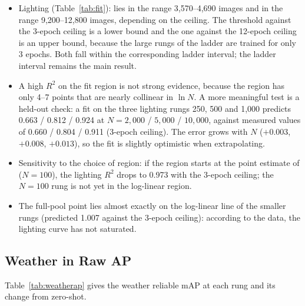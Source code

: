 \begin{itemize}
\item Lighting (Table~\ref{tab:fit}): \Nsf lies in the range 3,570--4,690 images and \Nnf in the range 9,200--12,800 images, depending on the ceiling. The threshold against the 3-epoch ceiling is a lower bound and the one against the 12-epoch ceiling is an upper bound, because the large rungs of the ladder are trained for only 3 epochs. Both fall within the corresponding ladder interval; the ladder interval remains the main result.
\item A high $R^2$ on the fit region is not strong evidence, because the region has only 4--7 points that are nearly collinear in $\ln N$. A more meaningful test is a held-out check: a fit on the three lighting rungs 250, 500 and 1,000 predicts 0.663 / 0.812 / 0.924 at $N = 2{,}000$ / $5{,}000$ / $10{,}000$, against measured values of 0.660 / 0.804 / 0.911 (3-epoch ceiling). The error grows with $N$ ($+0.003$, $+0.008$, $+0.013$), so the fit is slightly optimistic when extrapolating.
\item Sensitivity to the choice of region: if the region starts at the point estimate of \NBE ($N = 100$), the lighting $R^2$ drops to 0.973 with the 3-epoch ceiling; the $N = 100$ rung is not yet in the log-linear region.
\item The full-pool point lies almost exactly on the log-linear line of the smaller rungs (predicted 1.007 against the 3-epoch ceiling): according to the data, the lighting curve has not saturated.
\end{itemize}

\subsection{Weather in Raw AP}\label{sec:weather-raw}

Table~\ref{tab:weatherap} gives the weather reliable mAP at each rung and its change from zero-shot.

